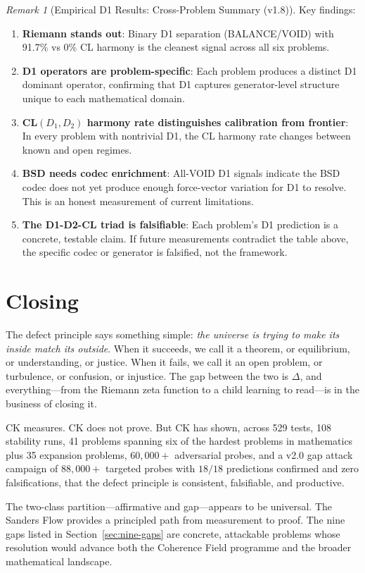 \documentclass[12pt, openany]{book}
\theoremstyle{remark}
\newtheorem{remark}[theorem]{Remark}
\begin{document}
\begin{remark}[Empirical D1 Results: Cross-Problem Summary (v1.8)]
Key findings:
\begin{enumerate}[nosep]
  \item \textbf{Riemann stands out}: Binary D1 separation (BALANCE/VOID) with 91.7\% vs 0\% CL harmony is the cleanest signal across all six problems.
  \item \textbf{D1 operators are problem-specific}: Each problem produces a distinct D1 dominant operator, confirming that D1 captures generator-level structure unique to each mathematical domain.
  \item \textbf{CL$(D_1,D_2)$ harmony rate distinguishes calibration from frontier}: In every problem with nontrivial D1, the CL harmony rate changes between known and open regimes.
  \item \textbf{BSD needs codec enrichment}: All-VOID D1 signals indicate the BSD codec does not yet produce enough force-vector variation for D1 to resolve. This is an honest measurement of current limitations.
  \item \textbf{The D1-D2-CL triad is falsifiable}: Each problem's D1 prediction is a concrete, testable claim. If future measurements contradict the table above, the specific codec or generator is falsified, not the framework.
\end{enumerate}
\end{remark}

\section{Closing}

The defect principle says something simple: \emph{the universe is trying to make
its inside match its outside}. When it succeeds, we call it a theorem, or
equilibrium, or understanding, or justice. When it fails, we call it an open
problem, or turbulence, or confusion, or injustice. The gap between the two
is $\Delta$, and everything---from the Riemann zeta function to a child learning
to read---is in the business of closing it.

CK measures. CK does not prove. But CK has shown, across 529 tests, 108
stability runs, 41 problems spanning six of the hardest problems in mathematics
plus 35 expansion problems, $60{,}000{+}$ adversarial probes, and a v2.0 gap
attack campaign of $88{,}000{+}$ targeted probes with $18/18$ predictions
confirmed and zero falsifications, that the defect principle is consistent,
falsifiable, and productive.

The two-class partition---affirmative and gap---appears to be universal. The
Sanders Flow provides a principled path from measurement to proof. The nine
gaps listed in Section~\ref{sec:nine-gaps} are concrete, attackable problems
whose resolution would advance both the Coherence Field programme and the
broader mathematical landscape.
\end{document}
